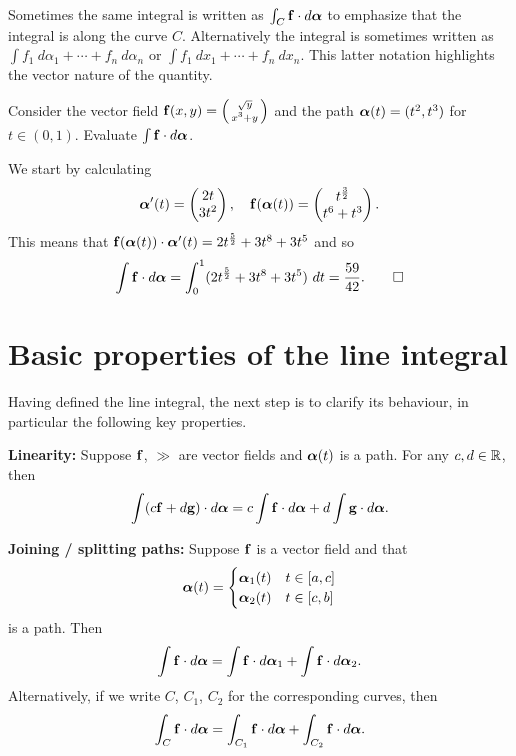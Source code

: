 Sometimes the same integral is written as \(\int_C \mathbf{f} \cdot d\boldsymbol{\alpha}  \) to emphasize that the integral is along the curve \(C\).
Alternatively the integral is sometimes written as \(\int f_1 \ d\alpha_1 + \cdots + f_n \ d\alpha_n\) or \(\int f_1 \ dx_1 + \cdots + f_n \ dx_n\).
This latter notation highlights the vector nature of the quantity.

\begin{example*}
    Consider the vector field \(\mathbf{f}(x,y) = \left(\begin{smallmatrix}
        \sqrt y \\ x^3 + y
    \end{smallmatrix}\right)\)
    and the path
    \(\boldsymbol{\alpha}(t)= (t^2,t^3)\) for \(t \in (0,1)\).
    Evaluate \(\int \mathbf{f} \cdot d\boldsymbol{\alpha}\).
\end{example*}
\begin{solution}
    We start by calculating
    \[
        \boldsymbol{\alpha}'(t) = \begin{pmatrix}
            2t \\ 3t^2
        \end{pmatrix},\\
        \quad
        \mathbf{f}(\boldsymbol{\alpha}(t)) = \begin{pmatrix}
            t^{\frac{3}{2}} \\ t^6 + t^3
        \end{pmatrix}.
    \]
    This means that \(\mathbf{f}(\boldsymbol{\alpha}(t)) \cdot  \boldsymbol{\alpha}'(t) =    2 t^{\frac{5}{2}} + 3t^8 + 3t^5\) and so
    \[
        \displaystyle\int \mathbf{f} \cdot d\boldsymbol{\alpha} = \displaystyle\int_{0}^{1} (2 t^{\frac{5}{2}} + 3t^8 + 3t^5 ) \ dt = \frac{59}{42}. \qedhere
    \]
\end{solution}

\section{Basic properties of the line integral}

Having defined the line integral, the next step is to clarify its behaviour, in particular the following key properties.

\noindent
\textbf{Linearity:}
Suppose \(\mathbf{f}\), \(\gg\) are vector fields and \(\boldsymbol{\alpha}(t)\) is a path. For any \(c,d\in \mathbb{R}\), then
\[
    \int (c\mathbf{f} + d\mathbf{g}) \cdot d\boldsymbol{\alpha} =  c \int \mathbf{f}  \cdot d\boldsymbol{\alpha} +  d \int \mathbf{g} \cdot d\boldsymbol{\alpha}.
\]

\noindent
\textbf{Joining / splitting paths:}
Suppose \(\mathbf{f}\) is a vector field and that
\[
    \boldsymbol{\alpha}(t) = \begin{cases}
        \boldsymbol{\alpha}_1(t) & t\in [a,c] \\
        \boldsymbol{\alpha}_2(t) & t\in [c,b]
    \end{cases}
\]
is a path.
Then
\[
    \int \mathbf{f}  \cdot d\boldsymbol{\alpha} = \int \mathbf{f}  \cdot d\boldsymbol{\alpha}_1  + \int \mathbf{f}  \cdot d\boldsymbol{\alpha}_2.
\]
Alternatively, if we write \(C\), \(C_1\), \(C_2\) for the corresponding curves, then
\[
    \int_{C} \mathbf{f}  \cdot d\boldsymbol{\alpha} = \int_{C_1} \mathbf{f}  \cdot d\boldsymbol{\alpha} + \int_{C_2} \mathbf{f}  \cdot d\boldsymbol{\alpha}.
\]


